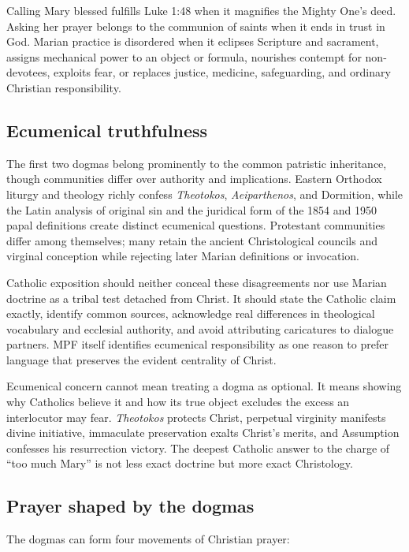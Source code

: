 Calling Mary blessed fulfills Luke 1:48 when it magnifies the Mighty One's deed. Asking her prayer belongs to the communion of saints when it ends in trust in God. Marian practice is disordered when it eclipses Scripture and sacrament, assigns mechanical power to an object or formula, nourishes contempt for non-devotees, exploits fear, or replaces justice, medicine, safeguarding, and ordinary Christian responsibility.

\subsection{Ecumenical truthfulness}

The first two dogmas belong prominently to the common patristic inheritance, though communities differ over authority and implications. Eastern Orthodox liturgy and theology richly confess \emph{Theotokos}, \emph{Aeiparthenos}, and Dormition, while the Latin analysis of original sin and the juridical form of the 1854 and 1950 papal definitions create distinct ecumenical questions. Protestant communities differ among themselves; many retain the ancient Christological councils and virginal conception while rejecting later Marian definitions or invocation.

Catholic exposition should neither conceal these disagreements nor use Marian doctrine as a tribal test detached from Christ. It should state the Catholic claim exactly, identify common sources, acknowledge real differences in theological vocabulary and ecclesial authority, and avoid attributing caricatures to dialogue partners. MPF itself identifies ecumenical responsibility as one reason to prefer language that preserves the evident centrality of Christ.

Ecumenical concern cannot mean treating a dogma as optional. It means showing why Catholics believe it and how its true object excludes the excess an interlocutor may fear. \emph{Theotokos} protects Christ, perpetual virginity manifests divine initiative, immaculate preservation exalts Christ's merits, and Assumption confesses his resurrection victory. The deepest Catholic answer to the charge of ``too much Mary'' is not less exact doctrine but more exact Christology.

\subsection{Prayer shaped by the dogmas}

The dogmas can form four movements of Christian prayer:


